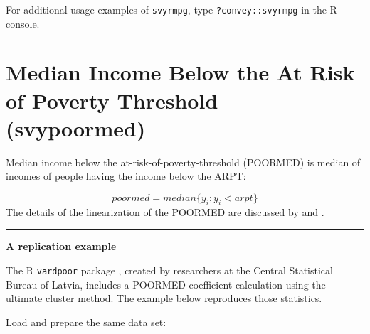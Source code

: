\documentclass[
]{book}
\newenvironment{Shaded}{\begin{snugshade}}{\end{snugshade}}
\newcommand{\CommentTok}[1]{\textcolor[rgb]{0.56,0.35,0.01}{\textit{#1}}}
\newcommand{\DecValTok}[1]{\textcolor[rgb]{0.00,0.00,0.81}{#1}}
\newcommand{\FunctionTok}[1]{\textcolor[rgb]{0.13,0.29,0.53}{\textbf{#1}}}
\newcommand{\NormalTok}[1]{#1}
\newcommand{\SpecialCharTok}[1]{\textcolor[rgb]{0.81,0.36,0.00}{\textbf{#1}}}
\begin{document}
\begin{Shaded}
\end{Shaded}

For additional usage examples of \texttt{svyrmpg}, type \texttt{?convey::svyrmpg} in the R console.

\hypertarget{median-income-below-the-at-risk-of-poverty-threshold-svypoormed}{%
\section{Median Income Below the At Risk of Poverty Threshold (svypoormed)}\label{median-income-below-the-at-risk-of-poverty-threshold-svypoormed}}

Median income below the at-risk-of-poverty-threshold (POORMED) is median of incomes of people having the income below the ARPT:

\[
poormed = median\{y_i; y_i< arpt\}
\]
The details of the linearization of the POORMED are discussed by \textcite{deville1999} and \textcite{osier2009}.

\begin{center}\rule{0.5\linewidth}{0.5pt}\end{center}

\textbf{A replication example}

The R \texttt{vardpoor} package \autocite{vardpoor}, created by researchers at the Central Statistical Bureau of Latvia, includes a POORMED coefficient calculation using the ultimate cluster method. The example below reproduces those statistics.

Load and prepare the same data set:
\end{document}

